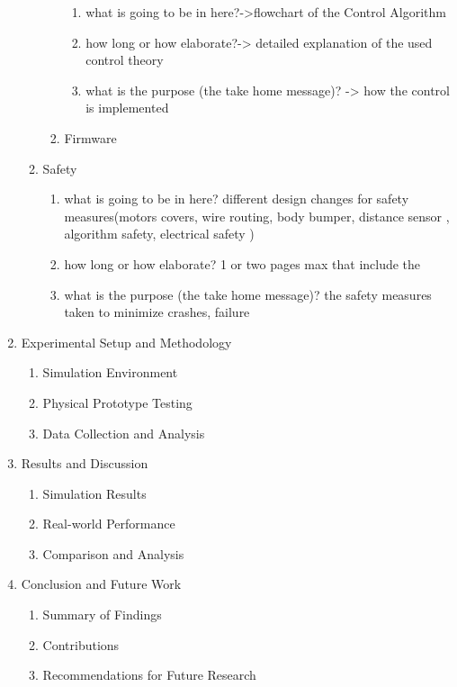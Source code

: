 \begin{enumerate}
\begin{enumerate}
\begin{enumerate}
			\begin{enumerate}
				\item what is going to be in here?->flowchart of the Control Algorithm
				\item how long or how elaborate?-> detailed explanation of the used control theory 
				\item what is the purpose (the take home message)? -> how the control is implemented 
			\end{enumerate}
			\item Firmware
		\end{enumerate}
		\item Safety 
		\begin{enumerate}
			\item what is going to be in here? different design changes for safety measures(motors covers, wire routing, body bumper, distance sensor , algorithm safety, electrical safety )
			\item how long or how elaborate? 1 or two pages max that include the 
			\item what is the purpose (the take home message)? the safety measures taken to minimize crashes, failure
		\end{enumerate}
	\end{enumerate}
	\item Experimental Setup and Methodology
	\begin{enumerate}
		\item Simulation Environment
		\item Physical Prototype Testing
		\item Data Collection and Analysis
	\end{enumerate}
	\item Results and Discussion
	\begin{enumerate}
		\item Simulation Results
		\item Real-world Performance
		\item Comparison and Analysis
	\end{enumerate}
	\item Conclusion and Future Work
	\begin{enumerate}
		\item Summary of Findings
		\item Contributions
		\item Recommendations for Future Research
	\end{enumerate}
\end{enumerate}
